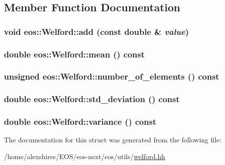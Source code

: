 \subsection{Member Function Documentation}
\hypertarget{structeos_1_1Welford_a42e2ae402d7f7944fea47ab9676d3ba5}{
\subsubsection[{add}]{\setlength{\rightskip}{0pt plus 5cm}void eos::Welford::add (const double \& {\em value})}}
\label{structeos_1_1Welford_a42e2ae402d7f7944fea47ab9676d3ba5}
\hypertarget{structeos_1_1Welford_a4ee0383dc9fc04f9319205ed7c39e6bc}{
\subsubsection[{mean}]{\setlength{\rightskip}{0pt plus 5cm}double eos::Welford::mean () const}}
\label{structeos_1_1Welford_a4ee0383dc9fc04f9319205ed7c39e6bc}
\hypertarget{structeos_1_1Welford_a3cbe78c6143406e01dfaff70fac96ecd}{
\subsubsection[{number\_\-of\_\-elements}]{\setlength{\rightskip}{0pt plus 5cm}unsigned eos::Welford::number\_\-of\_\-elements () const}}
\label{structeos_1_1Welford_a3cbe78c6143406e01dfaff70fac96ecd}
\hypertarget{structeos_1_1Welford_af2d5839b48295d51d5d97e4f6cb889ba}{
\subsubsection[{std\_\-deviation}]{\setlength{\rightskip}{0pt plus 5cm}double eos::Welford::std\_\-deviation () const}}
\label{structeos_1_1Welford_af2d5839b48295d51d5d97e4f6cb889ba}
\hypertarget{structeos_1_1Welford_a08c2dfcf9277822ed83ac7181ec46d6a}{
\subsubsection[{variance}]{\setlength{\rightskip}{0pt plus 5cm}double eos::Welford::variance () const}}
\label{structeos_1_1Welford_a08c2dfcf9277822ed83ac7181ec46d6a}


The documentation for this struct was generated from the following file:\begin{DoxyCompactItemize}
\item 
/home/alexshires/EOS/eos-\/next/eos/utils/\hyperlink{welford_8hh}{welford.hh}\end{DoxyCompactItemize}
